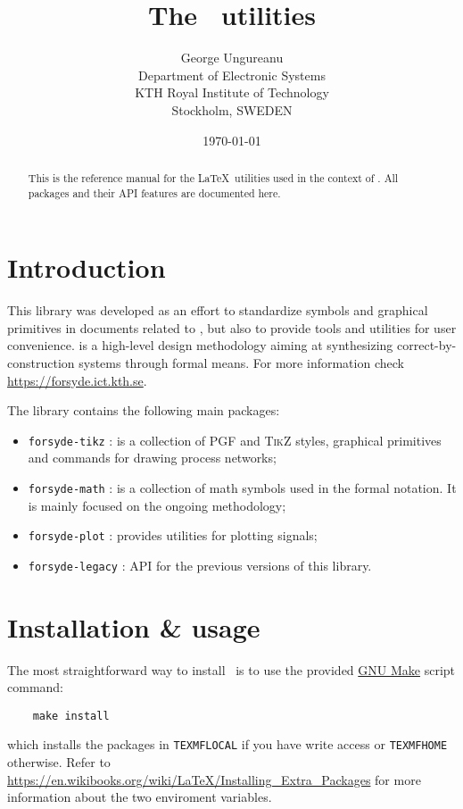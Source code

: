 \documentclass[10pt]{article}
\title{The \ForSyDeLaTeX\ utilities}
\author{
  George Ungureanu \\
  Department of Electronic Systems\\
  KTH Royal Institute of Technology\\
  Stockholm, SWEDEN
}
\date{\today}
\begin{document}
\maketitle
\reversemarginpar

\begin{abstract}
This is the reference manual for the \LaTeX\ utilities used in the context of \ForSyDe. All packages and their API features are documented here.
\end{abstract}

\section{Introduction}

This library was developed as an effort to standardize symbols and graphical primitives in documents related to \ForSyDe, but also to provide tools and utilities for user convenience. \ForSyDe is a high-level design methodology aiming at synthesizing correct-by-construction systems through formal means. For more information check \url{https://forsyde.ict.kth.se}.

The library contains the following main packages:
\begin{itemize}
\item \texttt{forsyde-tikz} : is a collection of \textsc{PGF} and \textsc{TikZ} styles, graphical primitives and commands for drawing \ForSyDe process networks;
\item \texttt{forsyde-math} : is a collection of math symbols used in the \ForSyDe formal notation. It is mainly focused on the ongoing \ForSyDeAtom methodology;
\item \texttt{forsyde-plot} : provides utilities for plotting \ForSyDe signals;
\item \texttt{forsyde-legacy} : API for the previous versions of this library.
\end{itemize}

\section{Installation \& usage}

The most straightforward way to install \ForSyDeLaTeX\ is to use the provided  \href{https://www.gnu.org/software/make/}{GNU Make} script command:
%
\begin{verbatim}
    make install
\end{verbatim}
%
\noindent which installs the packages in \texttt{TEXMFLOCAL} if you have write access or \texttt{TEXMFHOME} otherwise. Refer to \url{https://en.wikibooks.org/wiki/LaTeX/Installing_Extra_Packages} for more information about the two enviroment variables.
\end{document}
